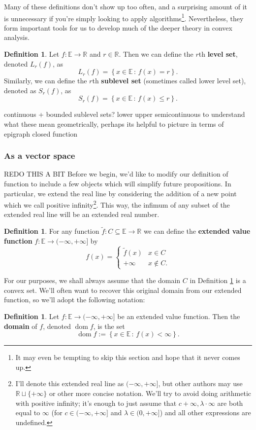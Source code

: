 \documentclass[11pt]{article}
\numberwithin{equation}{section}
\theoremstyle{definition}
\newtheorem{definition}[theorem]{Definition}%
\newcommand{\bE}{\mathbb{E}}
\newcommand{\bR}{\mathbb{R}}
\newcommand{\set}[2]{\left\{#1\,:\,#2\right\}}
\newcommand{\dom}{\operatorname{dom}}
\begin{document}
Many of these definitions don't show up too often, and a surprising amount of it is unnecessary if you're simply looking to apply algorithms\footnote{It may even be tempting to skip this section and hope that it never comes up.}. Nevertheless, they form important tools for us to develop much of the deeper theory in convex analysis.
\begin{definition}
    Let $f:\bE\to\bR$ and $r\in\bR$. Then we can define the $r$th \textbf{level set}, denoted $L_r(f)$, as
    \begin{equation}
        L_r(f)=\set{x\in\bE}{f(x)=r}.
    \end{equation}
    Similarly, we can define the $r$th \textbf{sublevel set} (sometimes called lower level set), denoted as $S_r(f)$, as
    \begin{equation}
        S_r(f)=\set{x\in\bE}{f(x)\le r}.
    \end{equation}
\end{definition}
continuous + bounded sublevel sets?
lower upper semicontinuous
to understand what these mean geometrically, perhaps its helpful to picture in terms of epigraph
closed function
\subsubsection{As a vector space}
REDO THIS A BIT
Before we begin, we'd like to modify our definition of function to include a few objects which will simplify future propositions. In particular, we extend the real line by considering the addition of a new point which we call positive infinity\footnote{I'll denote this extended real line as $(-\infty,+\infty]$, but other authors may use $\bR\sqcup\{+\infty\}$ or other more concise notation. We'll try to avoid doing arithmetic with positive infinity; it's enough to just assume that $c+\infty, \lambda\cdot \infty$ are both equal to $\infty$ (for $c\in(-\infty,+\infty]$ and $\lambda\in(0,+\infty]$) and all other expressions are undefined.}. This way, the infimum of any subset of the extended real line will be an extended real number.
\begin{definition}
\label{defevf}%
    For any function $\tilde f:C\subseteq\bE\to\bR$ we can define the \textbf{extended value function} $f:\bE\to(-\infty,+\infty]$ by
    \begin{equation}
        f(x)=\begin{cases}
            \tilde f(x)& x\in C\\
            +\infty & x\not\in C.
        \end{cases}
    \end{equation}
\end{definition}
For our purposes, we shall always assume that the domain $C$ in Definition \ref{defevf} is a convex set. We'll often want to recover this original domain from our extended function, so we'll adopt the following notation:
\begin{definition}
    Let $f:\bE\to(-\infty,+\infty]$ be an extended value function. Then the \textbf{domain} of $f$, denoted $\dom f$, is the set
    \begin{equation}
        \dom f:=\set{x\in\bE}{f(x)<\infty}.
    \end{equation}
\end{definition}
\end{document}
